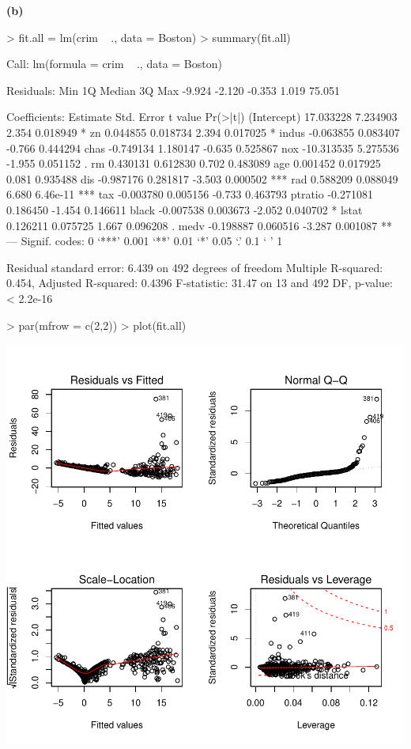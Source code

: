 \documentclass[a4paper]{article}
\renewcommand{\part}[1] {\vspace{.10in} {\bf (#1)}}
\begin{document}
\part{b}
\begin{Schunk}
\begin{Sinput}
> fit.all = lm(crim ~ ., data = Boston)
> summary(fit.all)
\end{Sinput}
\begin{Soutput}
Call:
lm(formula = crim ~ ., data = Boston)

Residuals:
   Min     1Q Median     3Q    Max 
-9.924 -2.120 -0.353  1.019 75.051 

Coefficients:
              Estimate Std. Error t value Pr(>|t|)    
(Intercept)  17.033228   7.234903   2.354 0.018949 *  
zn            0.044855   0.018734   2.394 0.017025 *  
indus        -0.063855   0.083407  -0.766 0.444294    
chas         -0.749134   1.180147  -0.635 0.525867    
nox         -10.313535   5.275536  -1.955 0.051152 .  
rm            0.430131   0.612830   0.702 0.483089    
age           0.001452   0.017925   0.081 0.935488    
dis          -0.987176   0.281817  -3.503 0.000502 ***
rad           0.588209   0.088049   6.680 6.46e-11 ***
tax          -0.003780   0.005156  -0.733 0.463793    
ptratio      -0.271081   0.186450  -1.454 0.146611    
black        -0.007538   0.003673  -2.052 0.040702 *  
lstat         0.126211   0.075725   1.667 0.096208 .  
medv         -0.198887   0.060516  -3.287 0.001087 ** 
---
Signif. codes:  0 ‘***’ 0.001 ‘**’ 0.01 ‘*’ 0.05 ‘.’ 0.1 ‘ ’ 1

Residual standard error: 6.439 on 492 degrees of freedom
Multiple R-squared:  0.454,	Adjusted R-squared:  0.4396 
F-statistic: 31.47 on 13 and 492 DF,  p-value: < 2.2e-16
\end{Soutput}
\begin{Sinput}
> par(mfrow = c(2,2))
> plot(fit.all)
\end{Sinput}
\end{Schunk}
\includegraphics{mutivariblelm-15b}
\end{document}
